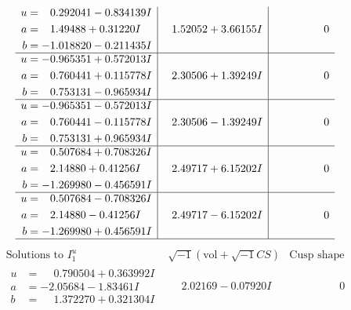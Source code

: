\documentclass[1p]{elsarticle_modified}
\theoremstyle{definition}
\newcommand{\I}{\sqrt{-1}}
\begin{document}
$$\begin{array}{c|c|c}
\begin{aligned}
u &= \phantom{-}0.292041 - 0.834139 I \\
a &= \phantom{-}1.49488 + 0.31220 I \\
b &= -1.018820 - 0.211435 I\end{aligned}
 & \phantom{-}1.52052 + 3.66155 I & \phantom{-0.000000 } 0 \\ \hline\begin{aligned}
u &= -0.965351 + 0.572013 I \\
a &= \phantom{-}0.760441 + 0.115778 I \\
b &= \phantom{-}0.753131 - 0.965934 I\end{aligned}
 & \phantom{-}2.30506 + 1.39249 I & \phantom{-0.000000 } 0 \\ \hline\begin{aligned}
u &= -0.965351 - 0.572013 I \\
a &= \phantom{-}0.760441 - 0.115778 I \\
b &= \phantom{-}0.753131 + 0.965934 I\end{aligned}
 & \phantom{-}2.30506 - 1.39249 I & \phantom{-0.000000 } 0 \\ \hline\begin{aligned}
u &= \phantom{-}0.507684 + 0.708326 I \\
a &= \phantom{-}2.14880 + 0.41256 I \\
b &= -1.269980 - 0.456591 I\end{aligned}
 & \phantom{-}2.49717 + 6.15202 I & \phantom{-0.000000 } 0 \\ \hline\begin{aligned}
u &= \phantom{-}0.507684 - 0.708326 I \\
a &= \phantom{-}2.14880 - 0.41256 I \\
b &= -1.269980 + 0.456591 I\end{aligned}
 & \phantom{-}2.49717 - 6.15202 I & \phantom{-0.000000 } 0\\
 \hline 
 \end{array}$$\newpage$$\begin{array}{c|c|c}  
\text{Solutions to }I^u_{1}& \I (\text{vol} + \sqrt{-1}CS) & \text{Cusp shape}\\
 \hline 
\begin{aligned}
u &= \phantom{-}0.790504 + 0.363992 I \\
a &= -2.05684 - 1.83461 I \\
b &= \phantom{-}1.372270 + 0.321304 I\end{aligned}
 & \phantom{-}2.02169 - 0.07920 I & \phantom{-0.000000 } 0 \\ \hline\begin{aligned}

\end{aligned}
\end{array}$$
\end{document}
